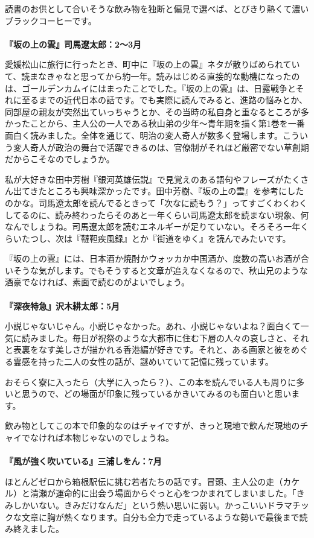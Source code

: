 読書のお供として合いそうな飲み物を独断と偏見で選べば、とびきり熱くて濃いブラックコーヒーです。
\\
\\
\textbf{『坂の上の雲』司馬遼太郎：2〜3月}

愛媛松山に旅行に行ったとき、町中に『坂の上の雲』ネタが散りばめられていて、読まなきゃなと思ってから約一年。読みはじめる直接的な動機になったのは、ゴールデンカムイにはまったことでした。『坂の上の雲』は、日露戦争とそれに至るまでの近代日本の話です。でも実際に読んでみると、進路の悩みとか、同部屋の親友が突然出ていっちゃうとか、その当時の私自身と重なるところが多かったことから、主人公の一人である秋山弟の少年〜青年期を描く第1巻を一番面白く読みました。全体を通じて、明治の変人奇人が数多く登場します。こういう変人奇人が政治の舞台で活躍できるのは、官僚制がそれほど厳密でない草創期だからこそなのでしょうか。

私が大好きな田中芳樹『銀河英雄伝説』で見覚えのある語句やフレーズがたくさん出てきたところも興味深かったです。田中芳樹、『坂の上の雲』を参考にしたのかな。司馬遼太郎を読んでるときって「次なに読もう？」ってすごくわくわくしてるのに、読み終わったらそのあと一年くらい司馬遼太郎を読まない現象、何なんでしょうね。司馬遼太郎を読むエネルギーが足りていない。そろそろ一年くらいたつし、次は『韃靼疾風録』とか『街道をゆく』を読んでみたいです。

『坂の上の雲』には、日本酒か焼酎かウォッカか中国酒か、度数の高いお酒が合いそうな気がします。でもそうすると文章が追えなくなるので、秋山兄のような酒豪でなければ、素面で読むのがよいでしょう。
\\
\\
\textbf{『深夜特急』沢木耕太郎：5月}

小説じゃないじゃん。小説じゃなかった。あれ、小説じゃないよね？面白くて一気に読みました。毎日が祝祭のような大都市に住む下層の人々の哀しさと、それと表裏をなす美しさが描かれる香港編が好きです。それと、ある画家と彼をめぐる霊感を持った二人の女性の話が、謎めいていて記憶に残っています。

おそらく寮に入ったら（大学に入ったら？）、この本を読んでいる人も周りに多いと思うので、どの場面が印象に残っているかきいてみるのも面白いと思います。

飲み物としてこの本で印象的なのはチャイですが、きっと現地で飲んだ現地のチャイでなければ本物じゃないのでしょうね。
\\
\\
\textbf{『風が強く吹いている』三浦しをん：7月}

ほとんどゼロから箱根駅伝に挑む若者たちの話です。冒頭、主人公の走（カケル）と清瀬が運命的に出会う場面からぐっと心をつかまれてしまいました。「きみしかいない。きみだけなんだ」という熱い思いに弱い。かっこいいドラマチックな文章に胸が熱くなります。自分も全力で走っているような勢いで最後まで読み終えました。

